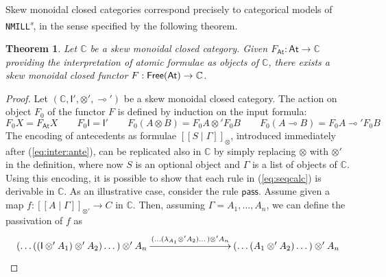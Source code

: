 \documentclass[submission,copyright,creativecommons]{eptcs}
\newtheorem{theorem}{Theorem}[section]
\theoremstyle{definition}
\newcommand{\ldbc}{[\![}
\newcommand{\rdbc}{]\!]}
\newcommand{\pass}{\mathsf{pass}}
\newcommand{\ot}{\otimes}
\newcommand{\lolli}{\multimap}
\newcommand{\I}{\mathsf{I}}
\newcommand{\NMILL}{\texttt{NMILL}}
\newcommand{\SkNMILL}{\NMILL\textsuperscript{\textit{s}}}
\newcommand{\FSkMCC}{\textsf{Free}}
\begin{document}
Skew monoidal closed categories correspond precisely to categorical models of \SkNMILL, in the sense specified by the following theorem.
\begin{theorem}\label{thm:models}
  Let $\mathbb{C}$ be a skew monoidal closed category. Given $F_{\mathsf{At}} : \mathsf{At} \rightarrow \mathbb{C}$ providing the interpretation of atomic formulae as objects of $\mathbb{C}$, there exists a skew monoidal closed functor $F : \text{\FSkMCC}(\mathsf{At}) \rightarrow \mathbb{C}$.
\end{theorem}
\begin{proof}
  Let $(\mathbb{C} , \I' , \ot' , \lolli')$ be a skew monoidal closed category.
  The action on object $F_0$ of the functor $F$ is defined by induction on the input formula:
  \begin{equation*}
    F_0X = F_{\mathsf{At}}X
    \qquad
    F_0\I = \I'
    \qquad
    F_0(A \ot B) = F_0A \ot' F_0B
    \qquad
    F_0(A \lolli B) = F_0A \lolli' F_0B
  \end{equation*}
  The encoding of antecedents as formulae $\ldbc S \mid \Gamma \rdbc_{\ot}$, introduced immediately after (\ref{eq:inter:ante}), can be replicated also in $\mathbb{C}$ by simply replacing $\ot$ with $\ot'$ in the definition, where now $S$ is an optional object and $\Gamma$ is a list of objects of $\mathbb{C}$. Using this encoding, it is possible to show that each rule in (\ref{eq:seqcalc}) is derivable in $\mathbb{C}$. As an illustrative case, consider the rule $\pass$. Assume given a map $f : \ldbc A \mid \Gamma \rdbc_{\ot'} \to C$ in $\mathbb{C}$. Then, assuming $\Gamma = A_1,\dots,A_n$, we can define the passivation of $f$ as
\[\xymatrixcolsep{7pc}
\xymatrix{
  (\dots ((\I \ot' A_1) \ot' A_2) \dots ) \ot' A_n
  \ar[r]^-{(\dots (\lambda_{A_1} \ot' A_2) \dots ) \ot' A_n} &
  (\dots (A_1 \ot' A_2) \dots ) \ot' A_n
}\]
\end{proof}
\end{document}
